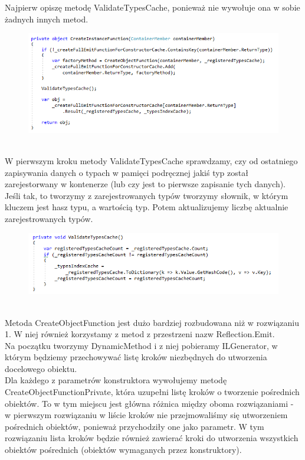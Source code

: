 \documentclass[12pt]{article}
\begin{document}
Najpierw opiszę metodę ValidateTypesCache, ponieważ nie wywołuje ona w sobie żadnych innych metod.
\begin{figure}[h]
	\begin{raggedleft}
  		\includegraphics{FullEmitFunction_CreateInstanceFunction.png}
	\end{raggedleft}
\end{figure}\\
W pierwszym kroku metody ValidateTypesCache sprawdzamy, czy od ostatniego zapisywania danych o typach w pamięci podręcznej jakiś typ został zarejestorwany w kontenerze (lub czy jest to pierwsze zapisanie tych danych). Jeśli tak, to tworzymy z zarejestrowanych typów tworzymy słownik, w którym kluczem jest hasz typu, a wartością typ. Potem aktualizujemy liczbę aktualnie zarejestrowanych typów.
\begin{figure}[h]
	\begin{raggedleft}
  		\includegraphics{FullEmitFunction_ValidateTypesCache.png}
	\end{raggedleft}
\end{figure}\\
Metoda CreateObjectFunction jest dużo bardziej rozbudowana niż w rozwiązaniu 1. W niej również korzystamy z metod z przestrzeni nazw Reflection.Emit.\\
Na początku tworzymy DynamicMethod i z niej pobieramy ILGenerator, w którym będziemy przechowywać listę kroków niezbędnych do utworzenia docelowego obiektu.\\
Dla każdego z parametrów konstruktora wywołujemy metodę CreateObjectFunctionPrivate, która uzupełni listę kroków o tworzenie pośrednich obiektów. To w tym miejscu jest główna różnica między oboma rozwiązaniami - w pierwszym rozwiązaniu w liście kroków nie przejmowaliśmy się utworzeniem pośrednich obiektów, ponieważ przychodziły one jako parametr. W tym rozwiązaniu lista kroków będzie również zawierać kroki do utworzenia wszystkich obiektów pośrednich (obiektów wymaganych przez konstruktory).\\
\end{document}
